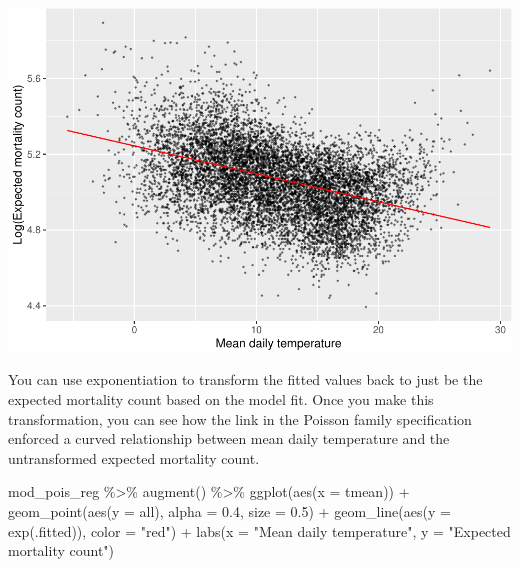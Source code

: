 \documentclass[
]{book}
\newenvironment{Shaded}{\begin{snugshade}}{\end{snugshade}}
\newcommand{\AttributeTok}[1]{\textcolor[rgb]{0.77,0.63,0.00}{#1}}
\newcommand{\FloatTok}[1]{\textcolor[rgb]{0.00,0.00,0.81}{#1}}
\newcommand{\FunctionTok}[1]{\textcolor[rgb]{0.00,0.00,0.00}{#1}}
\newcommand{\NormalTok}[1]{#1}
\newcommand{\SpecialCharTok}[1]{\textcolor[rgb]{0.00,0.00,0.00}{#1}}
\newcommand{\StringTok}[1]{\textcolor[rgb]{0.31,0.60,0.02}{#1}}
\begin{document}
\includegraphics{adv_epi_analysis_files/figure-latex/unnamed-chunk-31-1.pdf}

You can use exponentiation to transform the fitted values back to just be the
expected mortality count based on the model fit. Once you make this
transformation, you can see how the link in the Poisson family specification
enforced a curved relationship between mean daily temperature and the
untransformed expected mortality count.

\begin{Shaded}
\begin{Highlighting}[]
\NormalTok{mod\_pois\_reg }\SpecialCharTok{\%\textgreater{}\%} 
  \FunctionTok{augment}\NormalTok{() }\SpecialCharTok{\%\textgreater{}\%} 
  \FunctionTok{ggplot}\NormalTok{(}\FunctionTok{aes}\NormalTok{(}\AttributeTok{x =}\NormalTok{ tmean)) }\SpecialCharTok{+} 
  \FunctionTok{geom\_point}\NormalTok{(}\FunctionTok{aes}\NormalTok{(}\AttributeTok{y =}\NormalTok{ all), }\AttributeTok{alpha =} \FloatTok{0.4}\NormalTok{, }\AttributeTok{size =} \FloatTok{0.5}\NormalTok{) }\SpecialCharTok{+} 
  \FunctionTok{geom\_line}\NormalTok{(}\FunctionTok{aes}\NormalTok{(}\AttributeTok{y =} \FunctionTok{exp}\NormalTok{(.fitted)), }\AttributeTok{color =} \StringTok{"red"}\NormalTok{) }\SpecialCharTok{+} 
  \FunctionTok{labs}\NormalTok{(}\AttributeTok{x =} \StringTok{"Mean daily temperature"}\NormalTok{, }\AttributeTok{y =} \StringTok{"Expected mortality count"}\NormalTok{)}
\end{Highlighting}
\end{Shaded}
\end{document}
